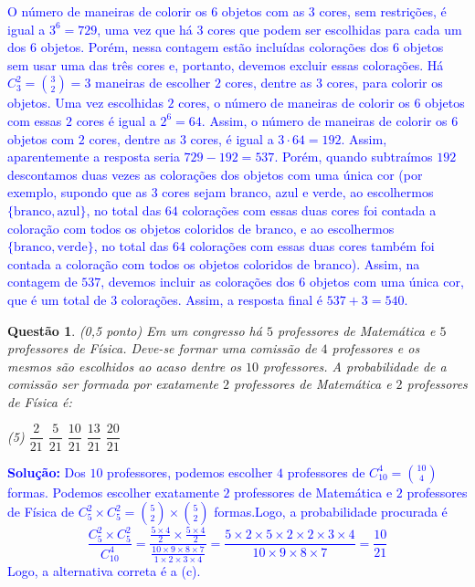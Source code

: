 \documentclass[oneside,a4paper,12pt]{article}
\newcommand{\negrito}[1]{\mbox{\boldmath{$#1$}}}
\theoremstyle{Colorido}
\theoremstyle{solu}
\theoremstyle{dotlessP}
\newcommand{\solucao}[1]{\textcolor{blue}{\textbf{Solução:} #1}}
\newtheorem{sol}{Questão}
\begin{document}
\textcolor{blue}{O número de maneiras de colorir os $6$ objetos com as $3$ cores, sem restrições, é igual a $3^6=729$, uma vez que há $3$ cores que podem ser escolhidas para cada um dos $6$ objetos. Porém, nessa contagem estão incluídas colorações dos $6$ objetos sem usar uma das três cores e, portanto, devemos excluir essas colorações. Há $C_3^2 = \binom{3}{2} =3$ maneiras de escolher $2$ cores, dentre as $3$ cores, para colorir os objetos. Uma vez escolhidas $2$ cores, o número de maneiras de colorir os $6$ objetos com essas $2$ cores é igual a $2^6=64$. Assim, o número de maneiras de colorir os $6$ objetos com $2$ cores, dentre as $3$ cores, é igual a $3\cdot64=192$. Assim, aparentemente a resposta seria $729-192=537$. Porém, quando subtraímos $192$ descontamos duas vezes as colorações dos objetos com uma única cor (por exemplo, supondo que as $3$ cores sejam branco, azul e verde, ao escolhermos $\{\mbox{branco}, \mbox{azul}\}$, no total das $64$ colorações com essas duas cores foi contada a coloração com todos os objetos coloridos de branco, e ao escolhermos $\{\mbox{branco}, \mbox{verde}\}$, no total das $64$ colorações com essas duas cores também foi contada a coloração com todos os objetos coloridos de branco). Assim, na contagem de $537$, devemos incluir as colorações dos $6$ objetos com uma única cor, que é um total de $3$ colorações. Assim, a resposta final é $537+3=540$.}
\newpage
	\begin{sol}
\textit{(0,5 ponto)} \newline \newline Em um congresso há $5$ professores de Matemática e $5$ professores de Física. Deve-se formar uma comissão de $4$ professores e os mesmos são escolhidos ao acaso dentre os $10$ professores. A probabilidade de a comissão ser formada por exatamente $2$ professores de Matemática e $2$ professores de Física é:

\begin{tasks}[counter-format={(tsk[a])},label-width=3.6ex, label-format = {\bfseries}, column-sep = {20pt}](5)
\task[\textcolor{blue}{$\negrito{(a)} $}] $\dfrac{2}{21}$
\task[\textcolor{blue}{$\negrito{(b)} $}] $\dfrac{5}{21}$
\task[\textcolor{blue}{$\negrito{(c)} $}] $\dfrac{10}{21}$
\task[\textcolor{blue}{$\negrito{(d)} $}] $\dfrac{13}{21}$
\task[\textcolor{blue}{$\negrito{(e)} $}] $\dfrac{20}{21}$
\end{tasks}
\end{sol}
\solucao{Dos $10$ professores, podemos escolher $4$ professores de $C_{10}^4 = \binom{10}{4}$ formas. Podemos escolher exatamente $2$ professores de Matemática e $2$ professores de Física de $C_5^2 \times C_5^2 = \binom{5}{2} \times \binom{5}{2}$ formas.Logo, a probabilidade procurada é\[\dfrac{C_5^2 \times C_5^2}{C_{10}^4}=\dfrac{\frac{5\times 4}{2} \times \frac{5\times 4}{2}}{\frac{10\times 9\times 8 \times 7}{1\times 2 \times 3 \times 4}} = \dfrac{5 \times 2 \times 5 \times 2 \times 2 \times 3 \times 4}{10\times 9\times 8 \times 7} =\dfrac{10}{21}\]Logo, a alternativa correta é a (c).}
\end{document}

